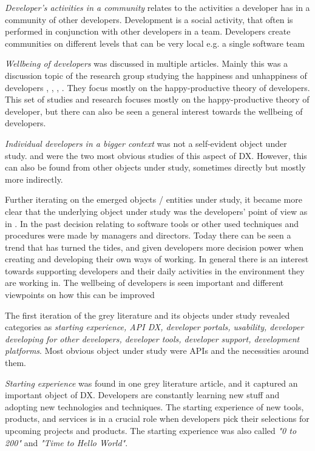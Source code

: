 \documentclass[english, 12pt, a4paper, sci, utf8, a-1b, online]{aaltothesis}
\newcounter{subsubsubsection}[subsubsection]
\begin{document}
\textit{Developer's activities in a community} relates to the activities a developer has in a community of other developers. Development is a social activity, that often is performed in conjunction with other developers in a team. Developers create communities on different levels that can be very local e.g. a single software team

\textit{Wellbeing of developers} was discussed in multiple articles. Mainly this was a discussion topic of the research group studying the happiness and unhappiness of developers \citep{what-happens-when-unhappy}, \citep{unhappy-developers}, \citep{consequences-of-unhappiness}, \citep{on-the-unhappiness}. They focus mostly on the happy-productive theory of developers. This set of studies and research focuses mostly on the happy-productive theory of developer, but there can also be seen a general interest towards the wellbeing of developers.   

\textit{Individual developers in a bigger context} was not a self-evident object under study. \citet{entering-an-ecosystem} and \citet{fagerholm2014examining} were the two most obvious studies of this aspect of DX. However, this can also be found from other objects under study, sometimes directly but mostly more indirectly. 

Further iterating on the emerged objects / entities under study, it became more clear that the underlying object under study was the developers' point of view as in \cite{voice-of-the-developer}. In the past decision relating to software tools or other used techniques and procedures were made by managers and directors. Today there can be seen a trend that has turned the tides, and given developers more decision power when creating and developing their own ways of working. In general there is an interest towards supporting developers and their daily activities in the environment they are working in. The wellbeing of developers is seen important and different viewpoints on how this can be improved 


The first iteration of the grey literature and its objects under study revealed categories as \textit{starting experience, API DX, developer portals, usability, developer developing for other developers, developer tools, developer support, development platforms}. Most obvious object under study were APIs and the necessities around them.

\textit{Starting experience} was found in one grey literature article, and it captured an important object of DX. Developers are constantly learning new stuff and adopting new technologies and techniques. The starting experience of new tools, products, and services is in a crucial role when developers pick their selections for upcoming projects and products. The starting experience was also called \textit{"0 to 200"} and \textit{"Time to Hello World"}.
\end{document}
